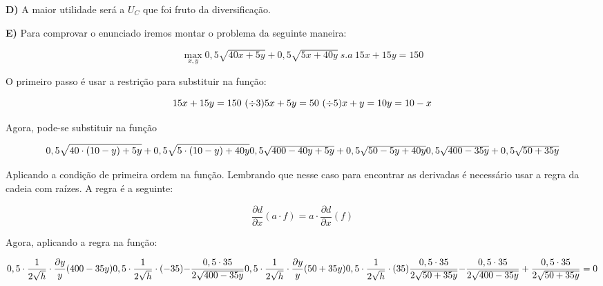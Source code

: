 \singlespacing

\textbf{D)} A maior utilidade será a \textbf{$U_{C}$} que foi fruto da diversificação.

\singlespacing

\textbf{E)} Para comprovar o enunciado iremos montar o problema da seguinte maneira:

\begin{equation}
	\max_{x,y} 0,5 \sqrt{40x + 5y} + 0,5 \sqrt{5x + 40y} \ s.a \ 15x + 15y = 150
\end{equation}

O primeiro passo é usar a restrição para substituir na função:

\begin{equation}
	15x + 15y = 150 \ (\div 3)
	$$\\$$
	5x + 5y = 50 \ (\div 5) 
	$$\\$$
	x + y = 10
	$$\\$$
	y = 10 - x
\end{equation}

Agora, pode-se substituir na função 

\begin{equation}
	0,5 \sqrt{40 \cdot (10 - y) + 5y} + 0,5 \sqrt{5 \cdot (10 - y) + 40y}
	$$\\$$ 
	0,5 \sqrt{400 - 40y + 5y} + 0,5 \sqrt{50 - 5y + 40y}
	$$\\$$
	0,5 \sqrt{400 - 35y} + 0,5 \sqrt{50 + 35y}
\end{equation}

Aplicando a condição de primeira ordem na função. Lembrando que nesse caso para encontrar as derivadas é necessário usar a regra da cadeia com raízes. A regra é a seguinte:

\begin{equation}
	\dfrac{\partial d}{\partial x} (a \cdot f) = a \cdot \dfrac{\partial d}{\partial x } (f)
\end{equation}

Agora, aplicando a regra na função:

\begin{equation}
	0,5 \cdot \dfrac{1}{2\sqrt{h}} \cdot \dfrac{\partial y }{y} (400 - 35y)
	$$\\$$
	0,5 \cdot \dfrac{1}{2\sqrt{h}} \cdot (-35)
	$$\\$$
	- \dfrac{0,5 \cdot 35}{2 \sqrt{400 - 35y}}
	$$\\$$
	0,5 \cdot \dfrac{1}{2\sqrt{h}} \cdot \dfrac{\partial y}{y} (50 + 35y)
	$$\\$$
	0,5 \cdot \dfrac{1}{2\sqrt{h}} \cdot (35)
	$$\\$$
	\dfrac{0,5 \cdot 35}{2 \sqrt{50 + 35y}}
	$$\\$$
	- \dfrac{0,5 \cdot 35}{2 \sqrt{400 - 35y}} + \dfrac{0,5 \cdot 35}{2 \sqrt{50 + 35y}} = 0
\end{equation}

